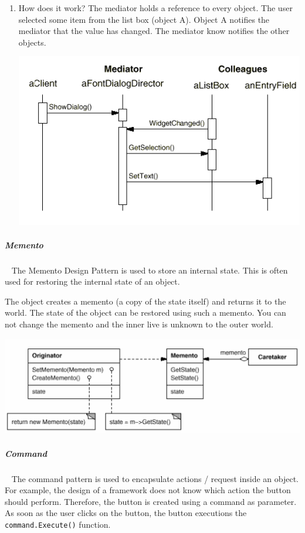 \documentclass[11pt,twoside,landscape]{article}
\begin{document}
\begin{multicols}{3}
\begin{enumerate}
\item How does it work?
\label{sec:orgab6ce89}
The mediator holds a reference to every object.
The user selected some item from the list box (object A).
Object A notifies the mediator that the value has changed.
The mediator know notifies the other objects.

{
\begin{center}
\includegraphics[width=.9\linewidth]{img/mediator_sequence_diagram.png}
\end{center}
\label{fig:mediator-sequence-diagram}
}
\end{enumerate}

\subparagraph{Memento} \
\label{sec:org92f4a9d}
The Memento Design Pattern is used to store an internal state.
This is often used for restoring the internal state of an object.

The object creates a memento (a copy of the state itself) and returns it to the world.
The state of the object can be restored using such a memento.
You can not change the memento and the inner live is unknown to the outer world.


{
\begin{center}
\includegraphics[width=.9\linewidth]{img/memento.png}
\end{center}
\label{fig:memento-class-diagram}
}
\subparagraph{Command} \
\label{sec:org61d6925}
The command pattern is used to encapsulate actions / request inside an object.
For example, the design of a framework does not know which action the button should perform.
Therefore, the button is created using a command as parameter.
As soon as the user clicks on the button, the button executions the \texttt{command.Execute()} function.


\end{multicols}
\end{document}
